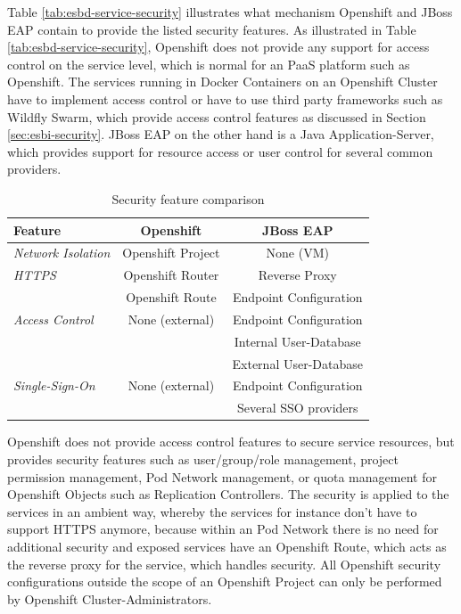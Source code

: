 Table \vref{tab:esbd-service-security} illustrates what mechanism Openshift and JBoss EAP contain to provide the listed security features. As illustrated in Table \vref{tab:esbd-service-security}, Openshift does not provide any support for access control on the service level, which is normal for an PaaS platform such as Openshift. The services running in Docker Containers on an Openshift Cluster have to implement access control or have to use third party frameworks such as Wildfly Swarm, which provide access control features as discussed in Section \vref{sec:esbi-security}. JBoss EAP on the other hand is a Java Application-Server, which provides support for resource access or user control for several common providers. 

{\renewcommand{\arraystretch}{1.2}%
	\begin{table}[h]
		\begin{tabularx}{\textwidth}{ X|c|c }	
			\textbf{Feature}                 & \textbf{Openshift}      & \textbf{JBoss EAP} \\  \hline
			\textit{Network Isolation}       & Openshift Project       & None (VM) \\  \hline
			\textit{HTTPS}                   & Openshift Router        & Reverse Proxy \\
			                                 & Openshift Route         & Endpoint Configuration \\  \hline
            \textit{Access Control}          & None (external)         & Endpoint Configuration \\
                                                                      && Internal User-Database \\ 
                                                                      && External User-Database \\  \hline
            \textit{Single-Sign-On}          & None (external)         & Endpoint Configuration \\
                                                                      && Several SSO providers \\  \hline
		\end{tabularx}
		\caption{Security feature comparison}
		\label{tab:esbd-service-security}
\end{table}}

Openshift does not provide access control features to secure service resources, but provides security features such as user/group/role management, project permission management, Pod Network management, or quota management for Openshift Objects such as Replication Controllers. The security is applied to the services in an ambient way, whereby the services for instance don't have to support HTTPS anymore, because within an Pod Network there is no need for additional security and exposed services have an Openshift Route, which acts as the reverse proxy for the service, which handles security. All Openshift security configurations outside the scope of an Openshift Project can only be performed by Openshift Cluster-Administrators. 
\newpage

